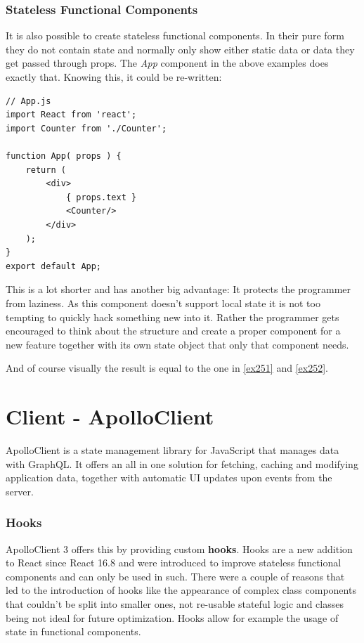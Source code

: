 \subsubsection{Stateless Functional Components}
It is also possible to create stateless functional components. In their pure form they do not contain state and normally only show either static data or data they get passed through props. The \emph{App} component in the above examples does exactly that. Knowing this, it could be re-written:
\begin{lstlisting}[caption={App as Functional Component}]
// App.js
import React from 'react';
import Counter from './Counter';

function App( props ) {
	return (
		<div>
			{ props.text }
			<Counter/>
		</div>
	);
}
export default App;
\end{lstlisting}
This is a lot shorter and has another big advantage: It protects the programmer from laziness. \cite{CoryHouse} As this component doesn't support local state it is not too tempting to quickly hack something new into it. Rather the programmer gets encouraged to think about the structure and create a proper component for a new feature together with its own state object that only that component needs.

And of course visually the result is equal to the one in \autoref{ex251} and \autoref{ex252}.

\newpage
\section{Client - ApolloClient}
ApolloClient is a state management library for JavaScript that manages data with GraphQL. It offers an all in one solution for fetching, caching and modifying application data, together with automatic UI updates upon events from the server. \cite{ApolloClientIntro}

\subsubsection{Hooks}
ApolloClient 3 offers this by providing custom \textbf{hooks}. Hooks are a new addition to React since React 16.8 and were introduced to improve stateless functional components \cite{ReactHooksIntro} and can only be used in such. \cite{ReactHooksOverview} There were a couple of reasons that led to the introduction of hooks like the appearance of complex class components that couldn't be split into smaller ones, not re-usable stateful logic and classes being not ideal for future optimization. \cite{ReactHooksIntro} Hooks allow for example the usage of state in functional components.

